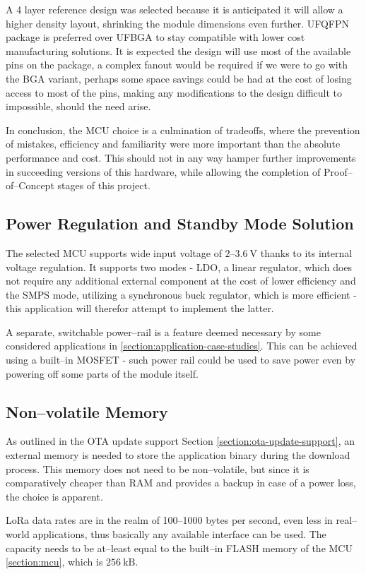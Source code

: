 A 4 layer reference design was selected because it is anticipated it will allow a higher density layout, shrinking the module dimensions even further. UFQFPN package is preferred over UFBGA to stay compatible with lower cost manufacturing solutions. It is expected the design will use most of the available pins on the package, a complex fanout would be required if we were to go with the BGA variant, perhaps some space savings could be had at the cost of losing access to most of the pins, making any modifications to the design difficult to impossible, should the need arise.

In conclusion, the MCU choice is a culmination of tradeoffs, where the prevention of mistakes, efficiency and familiarity were more important than the absolute performance and cost. This should not in any way hamper further improvements in succeeding versions of this hardware, while allowing the completion of Proof--of--Concept stages of this project. 

\subsection{Power Regulation and Standby Mode Solution}
The selected MCU supports wide input voltage of $2\text{--}3.6~\mathrm{V}$ thanks to its internal voltage regulation. It supports two modes - LDO, a linear regulator, which does not require any additional external component at the cost of lower efficiency and the SMPS mode, utilizing a synchronous buck regulator, which is more efficient - this application will therefor attempt to implement the latter.

A separate, switchable power--rail is a feature deemed necessary by some considered applications in \ref{section:application-case-studies}. This can be achieved using a built--in MOSFET - such power rail could be used to save power even by powering off some parts of the module itself.

\subsection{Non--volatile Memory}
As outlined in the OTA update support Section \ref{section:ota-update-support}, an external memory is needed to store the application binary during the download process. This memory does not need to be non--volatile, but since it is comparatively cheaper than RAM and provides a backup in case of a power loss, the choice is apparent.

LoRa data rates are in the realm of 100--1000 bytes per second, even less in real--world applications, thus basically any available interface can be used. The capacity needs to be at--least equal to the built--in FLASH memory of the MCU \ref{section:mcu}, which is $256~\mathrm{kB}$.

